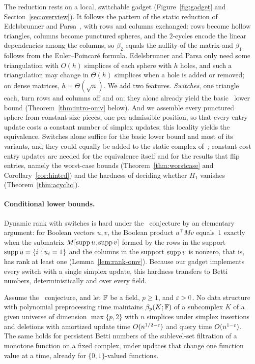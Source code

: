 The reduction rests on a local, switchable gadget (Figure~\ref{fig:gadget} and Section~\ref{sec:overview}).
It follows the pattern of the static reduction of Edelsbrunner and Parsa~\cite{EP14}, with rows and columns exchanged: rows become hollow triangles, columns become punctured spheres, and the $2$-cycles encode the linear dependencies among the columns, so $\beta_2$ equals the nullity of the matrix and $\beta_1$ follows from the Euler--Poincar\'e formula.
Edelsbrunner and Parsa only need some triangulation with $O(h)$ simplices of each sphere with $h$ holes, and such a triangulation may change in $\Theta(h)$ simplices when a hole is added or removed; on dense matrices, $h=\Theta(\sqrt n)$.
We add two features.
\emph{Switches}, one triangle each, turn rows and columns off and on; they alone already yield the basic \OMv\ lower bound (Theorem~\ref{thm:intro-omv} below).
And we assemble every punctured sphere from constant-size pieces, one per admissible position, so that every entry update costs a constant number of simplex updates; this locality yields the equivalence.
Switches alone suffice for the basic lower bound and most of its variants, and they could equally be added to the static complex of~\cite{EP14}; constant-cost entry updates are needed for the equivalence itself and for the results that flip entries, namely the worst-case bounds (Theorem~\ref{thm:worstcase} and Corollary~\ref{cor:hinted}) and the hardness of deciding whether $H_1$ vanishes (Theorem~\ref{thm:acyclic}).



\paragraph{Conditional lower bounds.}
Dynamic rank with switches is hard under the \OMv\ conjecture by an elementary argument: for Boolean vectors $u,v$, the Boolean product $u^{\top}Mv$ equals~$1$ exactly when the submatrix $M[\operatorname{supp} u,\operatorname{supp} v]$ formed by the rows in the support $\operatorname{supp} u=\{i:u_i=1\}$ and the columns in the support $\operatorname{supp} v$ is nonzero, that is, has rank at least one (Lemma~\ref{lem:rank-omv}).
Because our gadget implements every switch with a single simplex update, this hardness transfers to Betti numbers, deterministically and over every field.

\begin{theorem}\label{thm:intro-omv}
Assume the \OMv\ conjecture, and let $\mathbb{F}$ be a field, $p\ge1$, and $\varepsilon>0$.
No data structure with polynomial preprocessing time maintains $\beta_p(K;\mathbb{F})$ of a subcomplex $K$ of a given universe of dimension $\max\{p,2\}$ with $n$ simplices under simplex insertions and deletions with amortized update time $O(n^{1/2-\varepsilon})$ and query time $O(n^{1-\varepsilon})$.
The same holds for persistent Betti numbers of the sublevel-set filtration of a monotone function on a fixed complex, under updates that change one function value at a time, already for $\{0,1\}$-valued functions.
\end{theorem}


